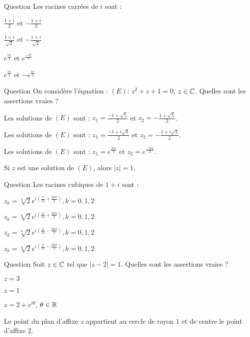 \begin{multi}[multiple,feedback=
{On résoud dans \(\Cc\) l'équation : \(z^2=i=e^{i\frac{\pi}{2}}\). 
}]{Question}
Les racines carrées de \(i\) sont :

    \item \(\frac{1+i}{2}\) et \(-\frac{1+i}{2}\)
    \item* \(\frac{1+i}{\sqrt 2}\) et \(-\frac{1+i}{\sqrt 2}\)
    \item \(e^{\frac{i\pi}{4}}\) et \(e^{\frac{-i\pi}{4}}\)
    \item* \(e^{\frac{i\pi}{4}}\) et \(-e^{\frac{i\pi}{4}}\)
\end{multi}


\begin{multi}[multiple,feedback=
{Les solutions complexes d'une équation du second degré \(az^2+bz+c=0\) sont \(z_1=\frac{-b+\delta}{2a}\) et  
\(z_1=\frac{-b-\delta}{2a}\), où \(\delta\) est une racine carrée de \(\Delta=b^2-4ac\).
}]{Question}
On considère l'équation : \((E) : \, z^2+z+1=0\), \(z\in \mathbb{C}\).   Quelles sont les assertions vraies ?

    \item Les solutions de \((E)\) sont : \(z_1= \frac{-1+\sqrt5}{2}\) et \(z_2= -\frac{1+\sqrt5}{2}\).
    \item* Les solutions de \((E)\) sont : \(z_1= \frac{-1+i\sqrt3}{2}\) et \(z_2= -\frac{1+i\sqrt3}{2}\).
    \item* Les solutions de \((E)\) sont : \(z_1= e^{\frac{2i\pi}{3}}\) et \(z_2=e^{\frac{-2i\pi}{3}}\).
    \item* Si \(z\) est une solution de \((E)\), alors \(|z|=1\).
\end{multi}


\begin{multi}[multiple,feedback=
{On résoud l'équation  : \(z^3=1+i= \sqrt 2e^{i\frac{\pi}{4}}\).
}]{Question}
Les racines cubiques de \(1+i\) sont :

    \item \(z_k=\sqrt[3]{2}e^{i(\frac{\pi}{12}+\frac{2k\pi}{3})}, k=0,1,2\)
    \item* \(z_k=\sqrt[6]{2}e^{i(\frac{\pi}{12}+\frac{2k\pi}{3})}, k=0,1,2\)
    \item* \(z_k=\sqrt[6]{2}e^{i(\frac{\pi}{12}-\frac{2k\pi}{3})}, k=0,1,2\)
    \item \(z_k=\sqrt[3]{2}e^{i(\frac{\pi}{12}-\frac{2k\pi}{3})}, k=0,1,2\)
\end{multi}


\begin{multi}[multiple,feedback=
{\(|z-2|=1\), donc \(z-2=e^{i\theta}\), \(\theta \in \Rr\).
}]{Question}
Soit \(z\in \mathbb{C}\) tel que \(|z-2|=1\).  Quelles sont les assertions vraies ?

    \item \(z=3\)
    \item \(z=1\)
    \item* \(z=2+e^{i\theta}\), \(\theta \in \Rr\)
    \item* Le point du plan d'affixe \(z\) appartient au cercle de rayon \(1\) et de centre le point d'affixe \(2\).
\end{multi}


